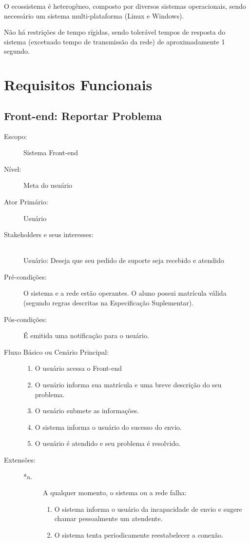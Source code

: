 \documentclass[brazil]{abnt}
\begin{document}
O ecossistema é heterogêneo, composto por diversos sistemas operacionais, sendo
necessário um sistema multi-plataforma (Linux e Windows).

Não há restrições de tempo rígidas, sendo tolerável tempos de resposta do
sistema (excetuado tempo de transmissão da rede) de aproximadamente 1 segundo.

\chapter{Requisitos Funcionais}
\section{Front-end: Reportar Problema}
\begin{description}
\item[Escopo:] Sistema Front-end
\item[Nível:] Meta do usuário
\item[Ator Primário:] Usuário

\item[Stakeholders e seus interesses:] \hfill \\ 
Usuário: Deseja que seu pedido de suporte seja recebido e atendido

\item[Pré-condições:] O sistema e a rede estão operantes. O aluno possui
matrícula válida (segundo regras descritas na Especificação Suplementar).

\item[Pós-condições:] É emitida uma notificação para o usuário.

\item[Fluxo Básico ou Cenário Principal:] \hfill
\begin{enumerate}
  \item O usuário acessa o Front-end
  \item O usuário informa sua matrícula e uma breve descrição do seu problema.
  \item O usuário submete as informações.
  \item O sistema informa o usuário do sucesso do envio.
  \item O usuário é atendido e seu problema é resolvido.
\end{enumerate}

\item[Extensões:] \hfill
\begin{description}
	\item[*a.] A qualquer momento, o sistema ou a rede falha:
		\begin{enumerate}
 			\item O sistema informa o usuário da incapacidade de envio e sugere chamar    
  			pessoalmente um atendente.
  			\item  O sistema tenta periodicamente reestabelecer a conexão.
		\end{enumerate}


\end{description}
\end{description}
\end{document}
